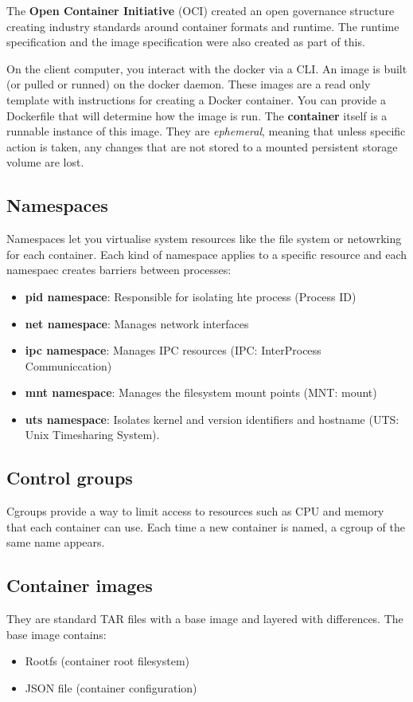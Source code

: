 \documentclass[11pt,a4paper,titlepage,dvipsnames,cmyk]{scrartcl}
\begin{document}
The \textbf{Open Container Initiative} (OCI) created an open governance structure creating industry standards around container formats and runtime. The runtime specification and the image specification were also created as part of this.

On the client computer, you interact with the docker via a CLI. An image is built (or pulled or runned) on the docker daemon. These images are a read only template with instructions for creating a Docker container. You can provide a Dockerfile that will determine how the image is run. The \textbf{container} itself is a runnable instance of this image. They are \textit{ephemeral}, meaning that unless specific action is taken, any changes that are not stored to a mounted persistent storage volume are lost.

\subsection{Namespaces}
Namespaces let you virtualise system resources like the file system or netowrking for each container. Each kind of namespace applies to a specific resource and each namespaec creates barriers between processes:
\begin{itemize}
    \item \textbf{pid namespace}: Responsible for isolating hte process (Process ID)
    \item \textbf{net namespace}: Manages network interfaces
    \item \textbf{ipc namespace}: Manages IPC resources (IPC: InterProcess Communiccation)
    \item \textbf{mnt namespace}: Manages the filesystem mount points (MNT: mount)
    \item \textbf{uts namespace}: Isolates kernel and version identifiers and hostname (UTS: Unix Timesharing System).
\end{itemize}

\subsection{Control groups}
Cgroups provide a way to limit access to resources such as CPU and memory that each container can use. Each time a new container is named, a cgroup of the same name appears.

\subsection{Container images}
They are standard TAR files with a base image and layered with differences. The base image contains:
\begin{itemize}
    \item Rootfs (container root filesystem)
    \item JSON file (container configuration)
\end{itemize}
\end{document}
